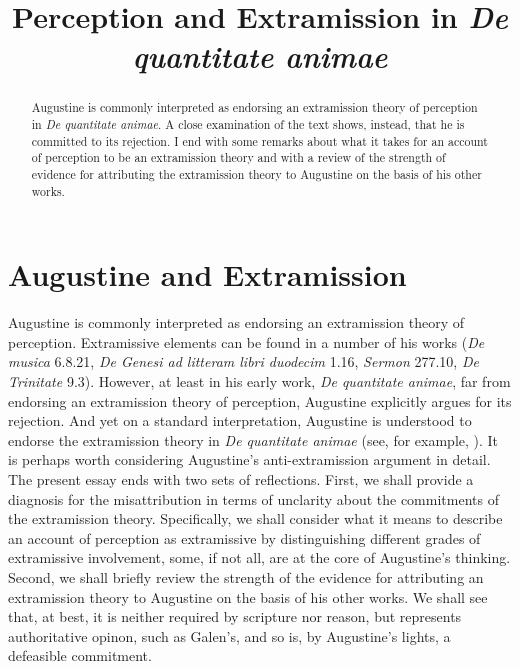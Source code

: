 \documentclass[12pt]{article}
\title{Perception and Extramission in \emph{De quantitate animae}}
\date{} %
\begin{document}
\maketitle
\begin{abstract}
	\noindent Augustine is commonly interpreted as endorsing an extramission theory of perception in \emph{De quantitate animae}. A close examination of the text shows, instead, that he is committed to its rejection. I end with some remarks about what it takes for an account of perception to be an extramission theory and with a review of the strength of evidence for attributing the extramission theory to Augustine on the basis of his other works.
\end{abstract}

\setlength{\parindent}{1em}


\section{Augustine and Extramission} %
\label{sec:augustine_and_extramission}

Augustine is commonly interpreted as endorsing an extramission theory of perception. Extramissive elements can be found in a number of his works (\emph{De musica} 6.8.21, \emph{De Genesi ad litteram libri duodecim} 1.16, \emph{Sermon} 277.10, \emph{De Trinitate} 9.3). However, at least in his early work, \emph{De quantitate animae}, far from endorsing an extramission theory of perception, Augustine explicitly argues for its rejection. And yet on a standard interpretation, Augustine is understood to endorse the extramission theory in \emph{De quantitate animae} (see, for example, \citealt[82--3]{ODaly:1987fq}). It is perhaps worth considering Augustine's anti-extramission argument in detail. The present essay ends with two sets of reflections. First, we shall provide a diagnosis for the misattribution in terms of unclarity about the commitments of the extramission theory. Specifically, we shall consider what it means to describe an account of perception as extramissive by distinguishing different grades of extramissive involvement, some, if not all, are at the core of Augustine's thinking. Second, we shall briefly review the strength of the evidence for attributing an extramission theory to Augustine on the basis of his other works. We shall see that, at best, it is neither required by scripture nor reason, but represents authoritative opinon, such as Galen's, and so is, by Augustine's lights, a defeasible commitment.
\end{document}
